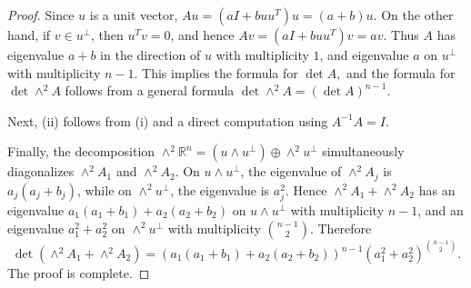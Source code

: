 \documentclass[11pt]{amsart}
\numberwithin{equation}{section}
\theoremstyle{definition}
\theoremstyle{definition}
\newcommand{\pr}[1]{\left(#1\right)}
\begin{document}
\begin{proof}
Since \(u\) is a unit vector, 
\(Au=(aI+buu^T)u=(a+b)u.\)
On the other hand, if \(v\in u^\perp\), then \(u^T v=0\), and hence
\(
Av=(aI+buu^T)v=av.
\)
Thus \(A\) has eigenvalue \(a+b\) in the direction of \(u\) with multiplicity \(1\), and eigenvalue \(a\) on \(u^\perp\) with multiplicity \(n-1\). 
This implies the formula for $\det A,$ and the formula for $\det \wedge^2 A$ follows from a general formula $\det \wedge^2 A = \pr{\det A}^{n-1}.$


Next, (ii) follows from (i) and a direct computation using $A^{-1}A=I$.

Finally, the decomposition
$\wedge^2\mathbb{R}^n
=(u\wedge u^\perp)\oplus \wedge^2 u^\perp$
simultaneously diagonalizes \(\wedge^2 A_1\) and \(\wedge^2 A_2\). 
On \(u\wedge u^\perp\), the eigenvalue of \(\wedge^2 A_j\) is \(a_j(a_j+b_j)\), while on \(\wedge^2 u^\perp\), the eigenvalue is \(a_j^2\). 
Hence \(\wedge^2 A_1+\wedge^2 A_2\) has an eigenvalue
$a_1(a_1+b_1)+a_2(a_2+b_2)$
on \(u\wedge u^\perp\) with multiplicity \(n-1\), and an eigenvalue
$a_1^2+a_2^2$
on \(\wedge^2 u^\perp\) with multiplicity \(\binom{n-1}{2}\). Therefore
\[
\det\!\left(\wedge^2 A_1+\wedge^2 A_2\right)
=
\left(a_1(a_1+b_1)+a_2(a_2+b_2)\right)^{n-1}
\left(a_1^2+a_2^2\right)^{\binom{n-1}{2}}.
\]
The proof is complete.
\end{proof}
\end{document}
